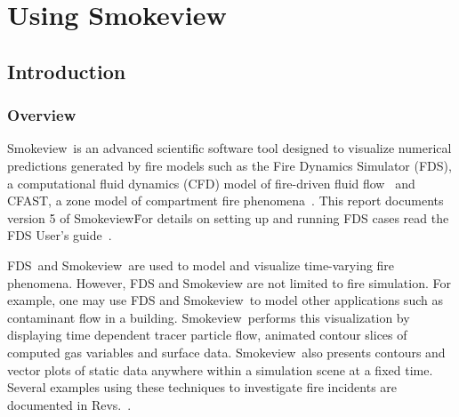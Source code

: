 \documentclass[11pt,twoside]{book}
\newcommand{\FDS}{{FDS}}
\newcommand{\fds}{{FDS}}
\newcommand{\Smokeview}{{Smokeview}}
\newcommand{\smokeview}{{Smokeview}}
\begin{document}
\tableofcontents
\listoffigures
\listoftables

\mainmatter


%
%
%

\part{Using Smokeview}
\chapter{Introduction}
\section{Overview}
\Smokeview\ is an advanced scientific software tool designed to visualize numerical
predictions generated by fire models such as the Fire Dynamics Simulator (\fds),
a computational fluid dynamics (CFD) model of fire-driven fluid
flow~\cite{FDS_Tech_Guide_5} and CFAST, a zone model of compartment fire phenomena~\cite{Jones:2004A}. This report documents version 5 of
\smokeview\. For details on setting up and
running FDS cases read the FDS User's
guide~\cite{FDS_Users_Guide_5}.

\FDS\ and \smokeview\ are used to model and visualize time-varying fire
phenomena. However, FDS and Smokeview are not limited to fire
simulation. For example, one may use FDS and \smokeview\ to model
other applications such as contaminant flow in a building.
\Smokeview\ performs this visualization by displaying time
dependent tracer particle flow, animated contour slices of
computed gas variables and surface data. \Smokeview\ also presents
contours and vector plots of static data anywhere within a
simulation scene at a fixed time. Several examples using these
techniques to investigate fire incidents are documented in
Revs.~\cite{CHERRYROAD,IOWA,HOUSTON,WTC}.
\end{document}
